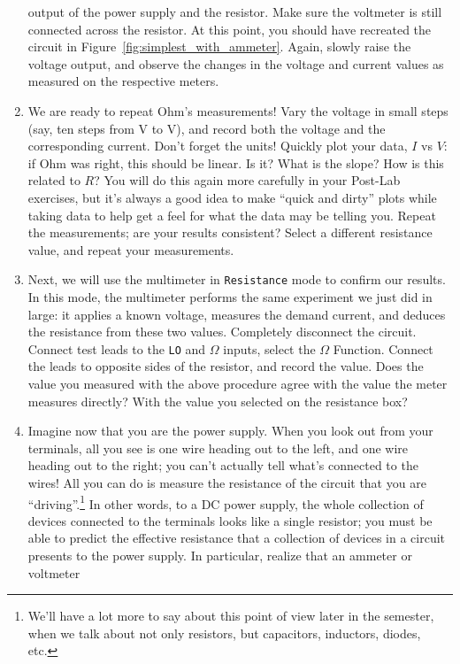 \documentclass[12pt]{article}
\begin{document}
\begin{enumerate}
  output of the power supply and the resistor.  Make sure the
  voltmeter is still connected across the resistor.  At this point,
  you should have recreated the circuit in
  Figure~\ref{fig:simplest_with_ammeter}.  Again, slowly raise the
  voltage output, and observe the changes in the voltage and current
  values as measured on the respective meters.
\item We are ready to repeat Ohm's measurements!  Vary the voltage in
  small steps (say, ten steps from \unit[0]{V} to \unit[10]{V}), and
  record both the voltage and the corresponding current.  Don't forget
  the units!  Quickly plot your data, $I$ vs $V$: if Ohm was right,
  this should be linear.  Is it?  What is the slope?  How is this
  related to $R$?  You will do this again more carefully in your
  Post-Lab exercises, but it's always a good idea to make ``quick and
  dirty'' plots while taking data to help get a feel for what the data
  may be telling you.  Repeat the measurements; are your results
  consistent?  Select a different resistance value, and repeat your
  measurements.
\item Next, we will use the multimeter in \texttt{Resistance} mode to
  confirm our results.  In this mode, the multimeter performs the same
  experiment we just did in large: it applies a known voltage,
  measures the demand current, and deduces the resistance from these
  two values.  Completely disconnect the circuit.  Connect test leads
  to the \texttt{LO} and \texttt{$\Omega$} inputs, select the
  \texttt{$\Omega$} Function.  Connect the leads to opposite sides of
  the resistor, and record the value.  Does the value you measured
  with the above procedure agree with the value the meter measures
  directly?  With the value you selected on the resistance box?
\item Imagine now that you are the power supply.  When you look out
  from your terminals, all you see is one wire heading out to the
  left, and one wire heading out to the right; you can't actually tell
  what's connected to the wires!  All you can do is measure the
  resistance of the circuit that you are ``driving''.\footnote{We'll
    have a lot more to say about this point of view later in the
    semester, when we talk about not only resistors, but capacitors,
    inductors, diodes, etc.}  In other words, to a DC power supply,
  the whole collection of devices connected to the terminals looks
  like a single resistor; you must be able to predict the effective
  resistance that a collection of devices in a circuit presents to the
  power supply.  In particular, realize that an ammeter or voltmeter

\end{enumerate}
\end{document}
